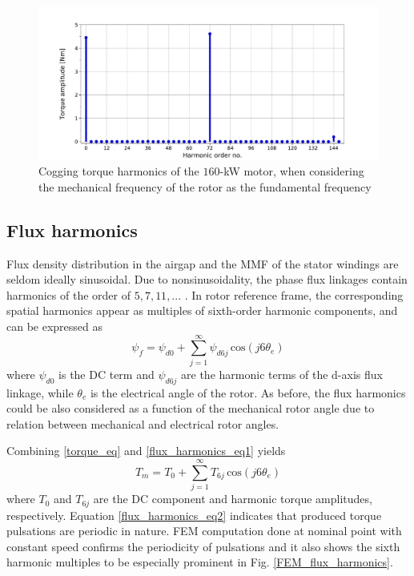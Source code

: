 \begin{figure}[htb] 
    \centering
    \includegraphics[width=1.0\linewidth]{images/cogging_harmonics.pdf} 
    \caption{Cogging torque harmonics of the $160$-kW motor, when considering the mechanical frequency of the rotor as the fundamental frequency}
    \label{FEM_cogging_harmonics}
\end{figure}


\subsection{Flux harmonics}
Flux density distribution in the airgap and the MMF of the stator windings are seldom ideally sinusoidal. Due to nonsinusoidality, the phase flux linkages contain harmonics of the order of $5,7,11,...$ \cite{TRR_SW:1998}. In rotor reference frame, the corresponding spatial harmonics appear as multiples of sixth-order harmonic components, and can be expressed as \cite{ILC:2004, ILC:2005, ILC:2018}
\begin{equation}
    \psi_{f} = \psi_{d0} + \sum_{j=\text{1}}^{\infty} \psi_{d6j} \, \text{cos}(j6\theta_e)
    \label{flux_harmonics_eq1}
\end{equation}
where $\psi_{d0}$ is the DC term and $\psi_{d6j}$ are the harmonic terms of the d-axis flux linkage, while $\theta_e$ is the electrical angle of the rotor. As before, the flux harmonics could be also considered as a function of the mechanical rotor angle due to relation between mechanical and electrical rotor angles.

Combining \eqref{torque_eq} and \eqref{flux_harmonics_eq1} yields
\begin{equation}
    T_m = T_0 + \sum_{j=\text{1}}^{\infty} T_{6j} \, \text{cos}(j6\theta_e)
    \label{flux_harmonics_eq2}
\end{equation}
where $T_0$ and $T_{6j}$ are the DC component and harmonic torque amplitudes, respectively. Equation \eqref{flux_harmonics_eq2} indicates that produced torque pulsations are periodic in nature. FEM computation done at nominal point with constant speed confirms the periodicity of pulsations and it also shows the sixth harmonic multiples to be especially prominent in Fig. \ref{FEM_flux_harmonics}.

